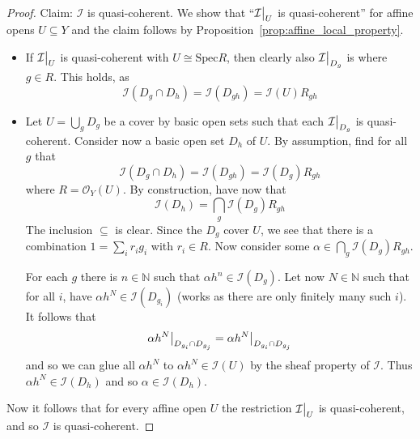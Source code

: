 \documentclass{scrartcl}
\newcommand{\N}{\mathbb{N}}
\newcommand{\Spec}{\mathrm{Spec}}
\renewcommand{\O}{\mathcal{O}}
\newcommand\restr[2]{{
    \left.\kern-\nulldelimiterspace
    #1
    \vphantom{\big|}
    \right|_{#2}
}}
\theoremstyle{definition}
\begin{document}
\begin{proof}
    Claim: $\mathcal{I}$ is quasi-coherent.
    We show that ``$\restr{\mathcal{I}}{U}$ is quasi-coherent'' for affine opens $U \subseteq Y$ and the claim follows by Proposition~\ref{prop:affine_local_property}.
    \begin{itemize}
        \item If $\restr{\mathcal{I}}{U}$ is quasi-coherent with $U \cong \Spec R$, then clearly also $\restr{\mathcal{I}}{D_g}$ is where $g \in R$.
        This holds, as
        \begin{equation*}
            \mathcal{I}(D_g \cap D_h) = \mathcal{I}(D_{gh}) = \mathcal{I}(U) R_{gh}
        \end{equation*}
        \item Let $U = \bigcup_g D_g$ be a cover by basic open sets such that each $\restr{\mathcal{I}}{D_g}$ is quasi-coherent.
        Consider now a basic open set $D_h$ of $U$.
        By assumption, find for all $g$ that
        \begin{equation*}
            \mathcal{I}(D_g \cap D_h) = \mathcal{I}(D_{gh}) = \mathcal{I}(D_g) R_{gh}
        \end{equation*}
        where $R = \O_Y(U)$.
        By construction, have now that
        \begin{equation*}
            \mathcal{I}(D_h) = \bigcap_g \mathcal{I}(D_g)R_{gh}
        \end{equation*}
        The inclusion $\subseteq$ is clear.
        Since the $D_g$ cover $U$, we see that there is a combination $1 = \sum_i r_i g_i$ with $r_i \in R$.
        Now consider some $\alpha \in \bigcap_g \mathcal{I}(D_g) R_{gh}$.
        
        For each $g$ there is $n \in \N$ such that $\alpha h^n \in \mathcal{I}(D_g)$.
        Let now $N \in \N$ such that for all $i$, have $\alpha h^N \in \mathcal{I}(D_{g_i})$ (works as there are only finitely many such $i$).
        It follows that
        \begin{equation*}
            \restr{\alpha h^N}{D_{g_i} \cap D_{g_j}} = \restr{\alpha h^N}{D_{g_i} \cap D_{g_j}}
        \end{equation*}
        and so we can glue all $\alpha h^N$ to $\alpha h^N \in \mathcal{I}(U)$ by the sheaf property of $\mathcal{I}$.
        Thus $\alpha h^N \in \mathcal{I}(D_h)$ and so $\alpha \in \mathcal{I}(D_h)$.
    \end{itemize}
    Now it follows that for every affine open $U$ the restriction $\restr{\mathcal{I}}{U}$ is quasi-coherent, and so $\mathcal{I}$ is quasi-coherent.


\end{proof}
\end{document}
